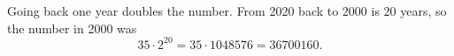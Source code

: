 Going back one year doubles the number. From 2020 back to 2000 is $20$ years, so the number in 2000 was
\[35\cdot2^{20}=35\cdot1048576=\boxed{36700160}.\]
